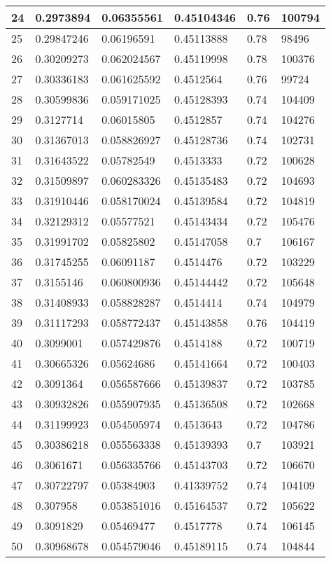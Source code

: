 \begin{longtable}{|l|l|l|l|l|l|}
24 & 0.2973894 & 0.06355561 & 0.45104346 & 0.76 & 100794 \\ \hline 
25 & 0.29847246 & 0.06196591 & 0.45113888 & 0.78 & 98496 \\ \hline 
26 & 0.30209273 & 0.062024567 & 0.45119998 & 0.78 & 100376 \\ \hline 
27 & 0.30336183 & 0.061625592 & 0.4512564 & 0.76 & 99724 \\ \hline 
28 & 0.30599836 & 0.059171025 & 0.45128393 & 0.74 & 104409 \\ \hline 
29 & 0.3127714 & 0.06015805 & 0.4512857 & 0.74 & 104276 \\ \hline 
30 & 0.31367013 & 0.058826927 & 0.45128736 & 0.74 & 102731 \\ \hline 
31 & 0.31643522 & 0.05782549 & 0.4513333 & 0.72 & 100628 \\ \hline 
32 & 0.31509897 & 0.060283326 & 0.45135483 & 0.72 & 104693 \\ \hline 
33 & 0.31910446 & 0.058170024 & 0.45139584 & 0.72 & 104819 \\ \hline 
34 & 0.32129312 & 0.05577521 & 0.45143434 & 0.72 & 105476 \\ \hline 
35 & 0.31991702 & 0.05825802 & 0.45147058 & 0.7 & 106167 \\ \hline 
36 & 0.31745255 & 0.06091187 & 0.4514476 & 0.72 & 103229 \\ \hline 
37 & 0.3155146 & 0.060800936 & 0.45144442 & 0.72 & 105648 \\ \hline 
38 & 0.31408933 & 0.058828287 & 0.4514414 & 0.74 & 104979 \\ \hline 
39 & 0.31117293 & 0.058772437 & 0.45143858 & 0.76 & 104419 \\ \hline 
40 & 0.3099001 & 0.057429876 & 0.4514188 & 0.72 & 100719 \\ \hline 
41 & 0.30665326 & 0.05624686 & 0.45141664 & 0.72 & 100403 \\ \hline 
42 & 0.3091364 & 0.056587666 & 0.45139837 & 0.72 & 103785 \\ \hline 
43 & 0.30932826 & 0.055907935 & 0.45136508 & 0.72 & 102668 \\ \hline 
44 & 0.31199923 & 0.054505974 & 0.4513643 & 0.72 & 104786 \\ \hline 
45 & 0.30386218 & 0.055563338 & 0.45139393 & 0.7 & 103921 \\ \hline 
46 & 0.3061671 & 0.056335766 & 0.45143703 & 0.72 & 106670 \\ \hline 
47 & 0.30722797 & 0.05384903 & 0.41339752 & 0.74 & 104109 \\ \hline 
48 & 0.307958 & 0.053851016 & 0.45164537 & 0.72 & 105622 \\ \hline 
49 & 0.3091829 & 0.05469477 & 0.4517778 & 0.74 & 106145 \\ \hline 
50 & 0.30968678 & 0.054579046 & 0.45189115 & 0.74 & 104844 \\ \hline 
\end{longtable}